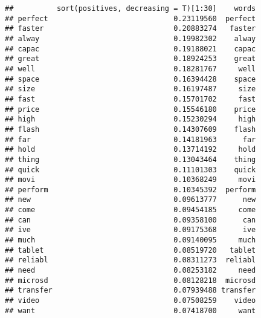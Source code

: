 \documentclass[
]{article}
\newenvironment{Shaded}{\begin{snugshade}}{\end{snugshade}}
\newcommand{\DataTypeTok}[1]{\textcolor[rgb]{0.13,0.29,0.53}{#1}}
\newcommand{\DecValTok}[1]{\textcolor[rgb]{0.00,0.00,0.81}{#1}}
\newcommand{\KeywordTok}[1]{\textcolor[rgb]{0.13,0.29,0.53}{\textbf{#1}}}
\newcommand{\NormalTok}[1]{#1}
\newcommand{\OperatorTok}[1]{\textcolor[rgb]{0.81,0.36,0.00}{\textbf{#1}}}
\newcommand{\StringTok}[1]{\textcolor[rgb]{0.31,0.60,0.02}{#1}}
\begin{document}
\begin{Shaded}
\end{Shaded}

\begin{verbatim}
##          sort(positives, decreasing = T)[1:30]    words
## perfect                             0.23119560  perfect
## faster                              0.20883274   faster
## alway                               0.19982302    alway
## capac                               0.19188021    capac
## great                               0.18924253    great
## well                                0.18281767     well
## space                               0.16394428    space
## size                                0.16197487     size
## fast                                0.15701702     fast
## price                               0.15546180    price
## high                                0.15230294     high
## flash                               0.14307609    flash
## far                                 0.14181963      far
## hold                                0.13714192     hold
## thing                               0.13043464    thing
## quick                               0.11101303    quick
## movi                                0.10368249     movi
## perform                             0.10345392  perform
## new                                 0.09613777      new
## come                                0.09454185     come
## can                                 0.09358100      can
## ive                                 0.09175368      ive
## much                                0.09140095     much
## tablet                              0.08519720   tablet
## reliabl                             0.08311273  reliabl
## need                                0.08253182     need
## microsd                             0.08128218  microsd
## transfer                            0.07939488 transfer
## video                               0.07508259    video
## want                                0.07418700     want
\end{verbatim}
\end{document}
